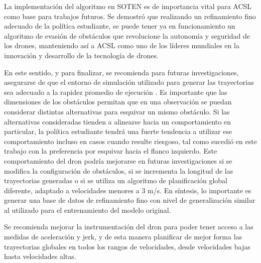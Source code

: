 La implementación del algoritmo en SOTEN es de importancia vital para ACSL como base para trabajos futuros. Se demostró que realizando un refinamiento fino adecuado de la política estudiante, se puede tener ya en funcionamiento un algoritmo de evasión de obstáculos que revolucione la autonomía y seguridad de los drones, manteniendo así a ACSL como uno de los líderes mundiales en la innovación y desarrollo de la tecnología de drones.

En este sentido, y para finalizar, se recomienda para futuras investigaciones, asegurarse de que el entorno de simulación utilizado para generar las trayectorias sea adecuado a la rapidez promedio de ejecución . Es importante que las dimensiones de los obstáculos permitan que en una observación se puedan considerar distintas alternativas para esquivar un mismo obstáculo. Si las alternativas consideradas tienden a alinearse hacia un comportamiento en particular, la política estudiante tendrá una fuerte tendencia a utilizar ese comportamiento incluso en casos cuando resulte riesgoso, tal como sucedió en este trabajo con la preferencia por esquivar hacia el flanco izquierdo. Este comportamiento del dron podría mejorarse en futuras investigaciones si se modifica la configuración de obstáculos, si se incrementa la longitud de las trayectorias generadas o si se utiliza un algoritmo de planificación global diferente, adaptado a velocidades  menores a 3 m/s. En síntesis, lo importante es generar una base de datos de refinamiento fino con nivel de generalización similar al utilizado para el entrenamiento del modelo original.

Se recomienda mejorar la instrumentación del dron para poder tener acceso a las medidas de aceleración y jerk, y de esta manera planificar de mejor forma las trayectorias globales en todos los rangos de velocidades, desde velocidades bajas hasta velocidades altas.